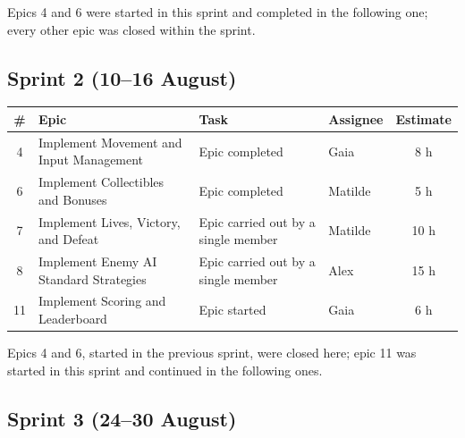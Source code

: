 Epics 4 and 6 were started in this sprint and completed in the following one; every other epic was closed within the
sprint.

\subsection*{Sprint 2 (10--16 August)}

\begin{center}
  \small
  \begin{tabular}{|c|p{3.5cm}|p{5.0cm}|p{2.3cm}|c|}
    \hline
    \textbf{\#} & \textbf{Epic} & \textbf{Task} & \textbf{Assignee} & \textbf{Estimate} \\
    \hline
    4 & Implement Movement and Input Management & Epic completed & Gaia & 8 h \\
    \hline
    6 & Implement Collectibles and Bonuses & Epic completed & Matilde & 5 h \\
    \hline
    7 & Implement Lives, Victory, and Defeat & Epic carried out by a single member & Matilde & 10 h \\
    \hline
    8 & Implement Enemy AI Standard Strategies & Epic carried out by a single member & Alex & 15 h \\
    \hline
    11 & Implement Scoring and Leaderboard & Epic started & Gaia & 6 h \\
    \hline
  \end{tabular}
\end{center}

Epics 4 and 6, started in the previous sprint, were closed here; epic 11 was started in this sprint and continued in
the following ones.

\subsection*{Sprint 3 (24--30 August)}

